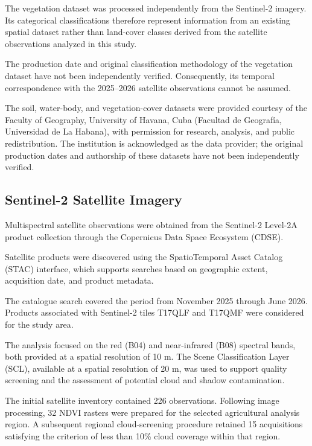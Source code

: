 The vegetation dataset was processed independently
from the Sentinel-2 imagery. Its categorical
classifications therefore represent information
from an existing spatial dataset rather than
land-cover classes derived from the satellite
observations analyzed in this study.

The production date and original classification
methodology of the vegetation dataset have not
been independently verified. Consequently,
its temporal correspondence with the
2025--2026 satellite observations cannot be
assumed.

The soil, water-body, and vegetation-cover
datasets were provided courtesy of the Faculty
of Geography, University of Havana, Cuba
(Facultad de Geografía, Universidad de La Habana),
with permission for research, analysis, and
public redistribution. The institution is
acknowledged as the data provider; the original
production dates and authorship of these datasets
have not been independently verified.


\subsection{Sentinel-2 Satellite Imagery}
\label{subsec:sentinel-data}

Multispectral satellite observations were obtained
from the Sentinel-2 Level-2A product collection
through the Copernicus Data Space Ecosystem
(CDSE).

Satellite products were discovered using the
SpatioTemporal Asset Catalog (STAC) interface,
which supports searches based on geographic
extent, acquisition date, and product metadata.

The catalogue search covered the period from
November 2025 through June 2026. Products
associated with Sentinel-2 tiles T17QLF and
T17QMF were considered for the study area.

The analysis focused on the red (B04) and
near-infrared (B08) spectral bands, both provided
at a spatial resolution of 10 m. The Scene
Classification Layer (SCL), available at a
spatial resolution of 20 m, was used to support
quality screening and the assessment of
potential cloud and shadow contamination.

The initial satellite inventory contained
226 observations. Following image processing,
32 NDVI rasters were prepared for the selected
agricultural analysis region. A subsequent
regional cloud-screening procedure retained
15 acquisitions satisfying the criterion of
less than 10\% cloud coverage within that region.

